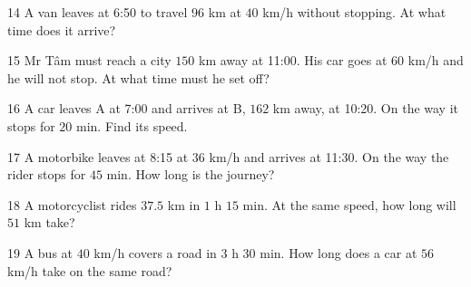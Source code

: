 \gap
\begin{probbox}{14}{\relax}
A van leaves at 6:50 to travel $96$ km at $40$ km/h without stopping. At what time does it arrive?
\end{probbox}
\gap
\begin{probbox}{15}{\relax}
Mr Tâm must reach a city $150$ km away at 11:00. His car goes at $60$ km/h and he will not stop. At what time must he set off?
\end{probbox}
\gap
\begin{probbox}{16}{\relax}
A car leaves A at 7:00 and arrives at B, $162$ km away, at 10:20. On the way it stops for $20$ min. Find its speed.
\end{probbox}
\gap
\begin{probbox}{17}{\relax}
A motorbike leaves at 8:15 at $36$ km/h and arrives at 11:30. On the way the rider stops for $45$ min. How long is the journey?
\end{probbox}
\gap
\begin{probbox}{18}{\relax}
A motorcyclist rides $37.5$ km in $1$ h $15$ min. At the same speed, how long will $51$ km take?
\end{probbox}
\gap
\begin{probbox}{19}{\relax}
A bus at $40$ km/h covers a road in $3$ h $30$ min. How long does a car at $56$ km/h take on the same road?
\end{probbox}

